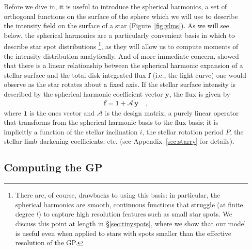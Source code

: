 \documentclass[modern]{aastex62}
\begin{document}
Before we dive in, it is useful to introduce the spherical harmonics,
a set of orthogonal functions on the surface of the sphere which we will use
to describe the intensity field on the surface of a star
(Figure~\ref{fig:ylms}). As we will see below,
the spherical harmonics are a particularly convenient basis in which to
describe star spot distributions%
\footnote{There are, of course, drawbacks to using this basis:
    in particular, the spherical harmonics are smooth, continuous functions that
    struggle (at finite degree $l$) to capture high resolution features such as
    small star spots. We discuss this point at length in \S\ref{sec:tinyspots},
    where we show that our model is useful even when applied to stars with spots
    smaller than the effective resolution of the GP.}, as they will allow us to compute
moments of the intensity distribution analytically. And of more immediate concern,
\citet{Luger2019} showed that there is a linear relationship between the
spherical harmonic expansion of a stellar surface and the total disk-integrated
flux $\mathbf{f}$ (i.e., the light curve)
one would observe as the star rotates about a fixed axis.
If the stellar surface intensity is described by the spherical harmonic
coefficient vector $\mathbf{y}$, the flux is given by
%
\begin{align}
    \label{eq:fAy}
    \mathbf{f} = \mathbf{1} + \pmb{\mathcal{A}} \, \mathbf{y}
    \quad,
\end{align}
%
where $\mathbf{1}$ is the ones vector and
$\pmb{\mathcal{A}}$ is the \starry
design matrix, a purely linear operator that transforms from the spherical
harmonic basis to the flux basis; it is implicitly
a function of the stellar inclination $i$, the stellar
rotation period $P$, the stellar limb darkening coefficients, etc.
(see Appendix~\ref{sec:starry} for details).

\subsection{Computing the GP}
\label{sec:gp}
%
\end{document}
